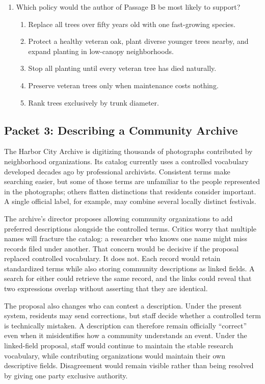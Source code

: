 \begin{enumerate}
\item Which policy would the author of Passage B be most likely to support?
\begin{enumerate}
\item[(A)] Replace all trees over fifty years old with one fast-growing species.
\item[(B)] Protect a healthy veteran oak, plant diverse younger trees nearby, and expand planting in low-canopy neighborhoods.
\item[(C)] Stop all planting until every veteran tree has died naturally.
\item[(D)] Preserve veteran trees only when maintenance costs nothing.
\item[(E)] Rank trees exclusively by trunk diameter.
\end{enumerate}

\end{enumerate}

\subsection*{Packet 3: Describing a Community Archive}

The Harbor City Archive is digitizing thousands of photographs contributed by neighborhood organizations. Its catalog currently uses a controlled vocabulary developed decades ago by professional archivists. Consistent terms make searching easier, but some of those terms are unfamiliar to the people represented in the photographs; others flatten distinctions that residents consider important. A single official label, for example, may combine several locally distinct festivals.

The archive's director proposes allowing community organizations to add preferred descriptions alongside the controlled terms. Critics worry that multiple names will fracture the catalog: a researcher who knows one name might miss records filed under another. That concern would be decisive if the proposal replaced controlled vocabulary. It does not. Each record would retain standardized terms while also storing community descriptions as linked fields. A search for either could retrieve the same record, and the links could reveal that two expressions overlap without asserting that they are identical.

The proposal also changes who can contest a description. Under the present system, residents may send corrections, but staff decide whether a controlled term is technically mistaken. A description can therefore remain officially ``correct'' even when it misidentifies how a community understands an event. Under the linked-field proposal, staff would continue to maintain the stable research vocabulary, while contributing organizations would maintain their own descriptive fields. Disagreement would remain visible rather than being resolved by giving one party exclusive authority.

